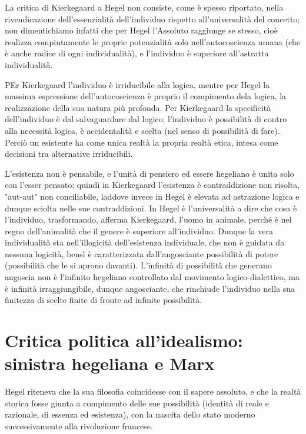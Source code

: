 La critica di Kierkegaard a Hegel non consiste, come è spesso riportato, nella rivendicazione dell'essenzialità dell'individuo rispetto all'universalità del concetto; non dimentichiamo infatti che per Hegel l'Assoluto raggiunge se stesso, cioè realizza compiutamente le proprie potenzialità solo nell'autocoscienza umana (che è anche radice di ogni individualità), e l'individuo è superiore all'astratta individualità.

 PEr Kierkegaard l'individuo è irriducibile alla logica, mentre per Hegel la massima espressione dell'autocoscienza è proprio il compimento dela logica, la realizzazione della sua natura più profonda. Per Kierkegaard la specificità dell'individuo è dal salvaguardare dal logico; l'individuo è possibilità di contro alla necessità logica, è accidentalità e scelta (nel senso di possibilità di fare). Perciò un esistente ha come unica realtà la propria realtà etica, intesa come decisioni tra alternative irriducibili. 
 
 L'esistenza non è pensabile, e l'unità di pensiero ed essere hegeliano è unita solo con l'esser pensato; quindi in Kierkegaard l'esistenza è contraddizione non risolta, "aut-aut" non conciliabile, laddove invece in Hegel è elevata ad astrazione logica e dunque sciolta nelle sue contraddizioni. In Hegel è l'universalità  a dire che cosa è l'individuo, trasformando, afferma Kierkegaard, l'uomo in animale, perché è nel regno dell'animalità che il genere è superiore all'individuo. Dunque la vera individualità sta nell'illogicità dell'esistenza individuale, che non è guidata da nessuna logicità, bensì è caratterizzata dall'angosciante possibilità di potere (possibilità che le si aprono davanti). L'infinità di possibilità che generano angoscia non è l'infinito hegeliano controllato dal movimento logico-dialettico, ma è infinità irraggiungibile, dunque angosciante, che rinchiude l'individuo nella sua finitezza di scelte finite di fronte ad infinite possibilità.
 
 \section{Critica politica all'idealismo: sinistra hegeliana e Marx}
 
 Hegel riteneva che la sua filosofia coincidesse con il sapere assoluto, e che la realtà storica fosse giunta a compimento delle sue possibilità (identità di reale e razionale, di essenza ed esistenza), con la nascita dello stato moderno successivamente alla rivoluzione francese.
 

